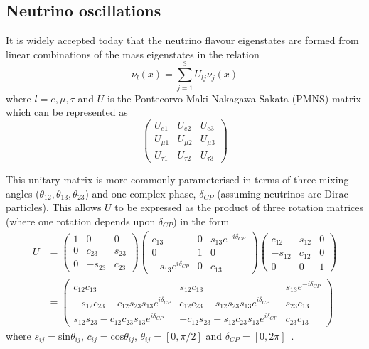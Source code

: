 \subsection{Neutrino oscillations}
\label{sec:theory:theory:oscillations}

It is widely accepted today that the neutrino flavour eigenstates are formed from linear combinations of the mass eigenstates in the relation
\begin{equation}
  \nu_{l}(x) = \sum_{j=1}^{3} U_{lj} \nu_{j}(x)
  \label{eq:massFlavSuper}
\end{equation}
where $l = e, \mu, \tau$ and $U$ is the Pontecorvo-Maki-Nakagawa-Sakata (PMNS) matrix which can be represented as
\begin{equation}
  \begin{pmatrix}
    U_{e1}     & U_{e2}     & U_{e3} \\
    U_{\mu 1}  & U_{\mu 2}  & U_{\mu 3} \\
    U_{\tau 1} & U_{\tau 2} & U_{\tau 3}
  \end{pmatrix}
\end{equation}

This unitary matrix is more commonly parameterised in terms of three mixing angles ($\theta_{12}, \theta_{13}, \theta_{23}$) and one complex phase, $\delta_{CP}$ (assuming neutrinos are Dirac particles).
This allows $U$ to be expressed as the product of three rotation matrices (where one rotation depends upon $\delta_{CP}$) in the form
\begin{align}
  U &=
  \begin{pmatrix}
    1 & 0       & 0 \\
    0 & c_{23}  & s_{23} \\
    0 & -s_{23} & c_{23}  
  \end{pmatrix}
  \begin{pmatrix}
    c_{13}                  & 0 & s_{13}e^{-i\delta_{CP}} \\
    0                       & 1 & 0 \\
    -s_{13}e^{i\delta_{CP}} & 0 & c_{13}
  \end{pmatrix}
  \begin{pmatrix}
    c_{12}  & s_{12} & 0 \\
    -s_{12} & c_{12} & 0 \\
    0       & 0      & 1
  \end{pmatrix}
  \\
  &=
  \begin{pmatrix}
    c_{12}c_{13} & s_{12}c_{13} & s_{13} e^{-i\delta_{CP}} \\
    -s_{12}c_{23}-c_{12}s_{23}s_{13}e^{i\delta_{CP}} & c_{12}c_{23}-s_{12}s_{23}s_{13}e^{i\delta_{CP}} & s_{23}c_{13} \\
    s_{12}s_{23}-c_{12}c_{23}s_{13}e^{i\delta_{CP}} & -c_{12}s_{23}-s_{12}c_{23}s_{13}e^{i\delta_{CP}} & c_{23}c_{13}
  \end{pmatrix}
\end{align}
where $s_{ij} = \text{sin}\theta_{ij}$, $c_{ij} = \text{cos}\theta_{ij}$, $\theta_{ij} = [0, \pi/2]$ and $\delta_{CP} = [0, 2\pi]$~\cite{pmnsMatrix}.

